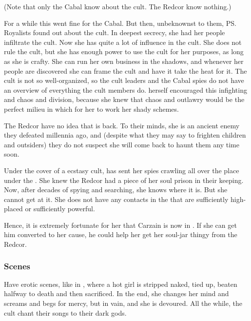(Note that only the Cabal know about the cult. The Redcor know nothing.) 

For a while this went fine for the Cabal. 
But then, unbeknownst to them, \ps{\Shiaraid} Royalists found out about the cult. 
In deepest secrecy, she had her people infiltrate the cult. 
Now she has quite a lot of influence in the cult. 
She does not rule the cult, but she has enough power to use the cult for her purposes, as long as she is crafty. 
She can run her own business in the shadows, and whenever her people are discovered she can frame the cult and have it take the heat for it. 
The cult is not so well-organized, so the cult leaders and the Cabal spies do not have an overview of everything the cult members do. 
\Shiaraid{} herself encouraged this infighting and chaos and division, because she knew that chaos and outlawry would be the perfect milieu in which for her to work her shady schemes. 

The Redcor have no idea that \Shiaraid{} is back. 
To their minds, she is an ancient enemy they defeated millennia ago, and (despite what they may say to frighten children and outsiders) they do not suspect she will come back to haunt them any time soon. 

Under the cover of a  ecstasy cult, \Shiaraid{} has sent her spies crawling all over the place under the \TopazChateau{}. 
She knew the Redcor had a piece of her soul prison in their keeping. 
Now, after decades of spying and searching, she knows where it is. 
But she cannot get at it. 
She does not have any contacts in the \Chateau{} that are sufficiently high-placed or sufficiently powerful. 

Hence, it is extremely fortunate for her that Carzain is now in \Redce. 
If she can get him converted to her cause, he could help her get her soul-jar thingy from the Redcor. 





\subsubsection{Scenes}
Have erotic scenes, like in \cite{GaryMyers:TheHorrorShow}, where a hot girl is stripped naked, tied up, beaten halfway to death and then sacrificed. 
In the end, she changes her mind and screams and begs for mercy, but in vain, and she is devoured. 
All the while, the cult chant their songs to their dark gods. 







